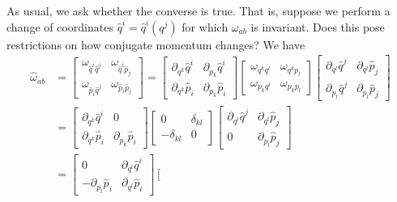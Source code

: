 As usual, we ask whether the converse is true. That is, suppose we perform a change of coordinates $\hat{q}^i = \hat{q}^i(q^j)$ for which $\omega_{ab}$ is invariant. Does this pose restrictions on how conjugate momentum changes? We have
\begin{equation}
	\begin{aligned}
		\hat{\omega}_{ab} &=\left[\begin{array}{cc}
			\omega_{\hat{q}^i \hat{q}^j} & \omega_{\hat{q}^i \hat{p}_j} \\
			\omega_{\hat{p}_i \hat{q}^j} & \omega_{\hat{p}_i \hat{p}_j} 
		\end{array} \right] = \left[\begin{array}{cc}
			\partial_{q^k} \hat{q}^i & \partial_{p_k} \hat{q}^i \\
			\partial_{q^k} \hat{p}_i & \partial_{p_k} \hat{p}_i 
		\end{array} \right]
		\left[\begin{array}{cc}
			\omega_{q^k q^l} & \omega_{q^k p_l} \\
			\omega_{p_k q^l} & \omega_{p_k p_l} 
		\end{array} \right]
		\left[\begin{array}{cc}
			\partial_{q^l} \hat{q}^j & \partial_{q^l} \hat{p}_j \\
			\partial_{p_l} \hat{q}^j & \partial_{p_l} \hat{p}_j 
		\end{array} \right]\\
		&= \left[\begin{array}{cc}
			\partial_{q^k} \hat{q}^i & 0 \\
			\partial_{q^k} \hat{p}_i & \partial_{p_k} \hat{p}_i 
		\end{array} \right]
		\left[\begin{array}{cc}
			0 & \delta_{kl} \\
			- \delta_{kl} & 0 
		\end{array} \right]
		\left[\begin{array}{cc}
			\partial_{q^l} \hat{q}^j & \partial_{q^l} \hat{p}_j \\
			0 & \partial_{p_l} \hat{p}_j 
		\end{array} \right] \\
		&= \left[\begin{array}{cc}
			0 & \partial_{q^l} \hat{q}^i \\
			- \partial_{p_l} \hat{p}_i  & \partial_{q^l} \hat{p}_i 
		\end{array} \right]
		\left[\begin{array}{cc}

\end{array}
\end{aligned}
\end{equation}
